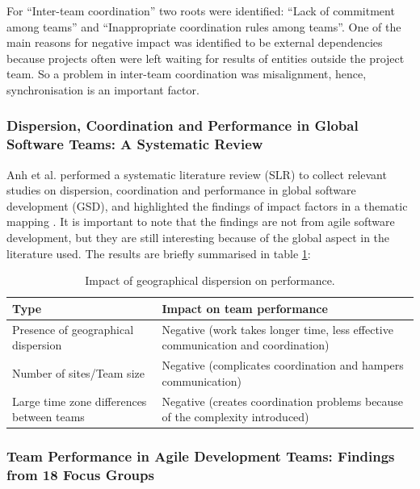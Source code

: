 For ``Inter-team coordination'' two roots were identified: ``Lack of commitment among teams'' and ``Inappropriate coordination rules among teams''. One of the main reasons for negative impact was identified to be external dependencies because projects often were left waiting for results of entities outside the project team. So a problem in inter-team coordination was misalignment, hence, synchronisation is an important factor.

\subsubsection{Dispersion, Coordination and Performance in Global Software Teams: A Systematic Review}

Anh et al. performed a systematic literature review (SLR) to collect relevant studies on dispersion, coordination and performance in global software development (GSD), and highlighted the findings of impact factors in a thematic mapping \cite{Anh2012}. It is important to note that the findings are not from agile software development, but they are still interesting because of the global aspect in the literature used. The results are briefly summarised in table \ref{GSD}:

\begin{table}[H]
\begin{center}
    \begin{tabular}{ | p{4cm} | p{7.5cm} |}
    \hline
    \textbf{Type} & \textbf{Impact on team performance} \\ \hline
    Presence of geographical dispersion & Negative (work takes longer time, less effective communication and coordination) \\ \hline
    Number of sites/Team size & Negative (complicates coordination and hampers communication) \\ \hline
    Large time zone differences between teams & Negative (creates coordination problems because of the complexity introduced) \\ \hline
    \end{tabular}
    \caption{Impact of geographical dispersion on performance.}
    \label{GSD}
\end{center}
\end{table}

\subsubsection{Team Performance in Agile Development Teams: Findings from 18 Focus Groups}

